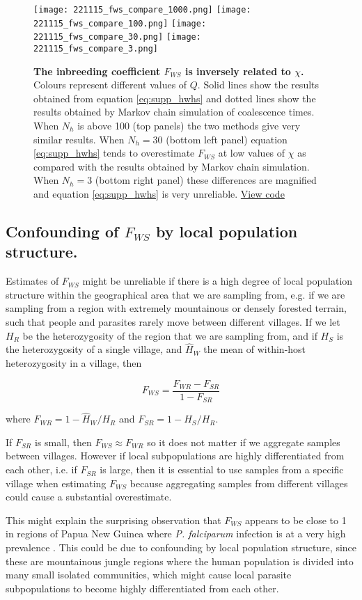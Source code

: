 \documentclass[_main.tex]{subfiles}
\begin{document}
\begin{figure}[h!]
\centering
\texttt{[image: 221115\_fws\_compare\_1000.png]}
\texttt{[image: 221115\_fws\_compare\_100.png]}
\texttt{[image: 221115\_fws\_compare\_30.png]}
\texttt{[image: 221115\_fws\_compare\_3.png]}
\caption{\textbf{The inbreeding coefficient $F_{WS}$ is inversely related to $\chi$.}  Colours represent different values of $Q$.  Solid lines show the results obtained from equation \ref{eq:supp_hwhs} and dotted lines show the results obtained by Markov chain simulation of coalescence times.  When $N_h$ is above 100 (top panels) the two methods give very similar results.  When $N_h = 30$ (bottom left panel) equation \ref{eq:supp_hwhs} tends to overestimate $F_{WS}$ at low values of $\chi$ as compared with the results obtained by Markov chain simulation.  When $N_h = 3$ (bottom right panel) these differences are magnified and equation \ref{eq:supp_hwhs} is very unreliable. 
\href{https://github.com/d-kwiat/gtg/blob/main/fws_compare_methods.ipynb}{View code}
}
\label{fig:supp_fws_compare_methods}
\end{figure}

\subsection{Confounding of \texorpdfstring{$F_{WS}$}{Fws} by local population structure.}
\label{supp_fws_pop_structure}  

Estimates of $F_{WS}$ might be unreliable if there is a high degree of local population structure within the geographical area that we are sampling from, e.g. if we are sampling from a region with extremely mountainous or densely forested terrain, such that people and parasites rarely move between different villages.  If we let $H_R$ be the heterozygosity of the region that we are sampling from, and if $H_S$ is the heterozygosity of a single village, and $\widehat{H}_W$ the mean of within-host heterozygosity in a village, then 

\begin{equation*}
F_{WS} = \frac{F_{WR} - F_{SR}}{1 - F_{SR}}
\end{equation*}

where $F_{WR} = 1 - \widehat{H}_W / H_R$ and $F_{SR} = 1 - H_S / H_R$.  

If $F_{SR}$ is small, then $F_{WS} \approx F_{WR}$ so it does not matter if we aggregate samples between villages.  However if local subpopulations are highly differentiated from each other, i.e. if $F_{SR}$ is large, then it is essential to use samples from a specific village when estimating $F_{WS}$ because aggregating samples from different villages could cause a substantial overestimate.

This might explain the surprising observation that $F_{WS}$ appears to be close to 1 in regions of Papua New Guinea where \textit{P. falciparum} infection is at a very high prevalence \cite{Manske2012,MalariaGEN2021}.  This could be due to confounding by local population structure, since these are mountainous jungle regions where the human population is divided into many small isolated communities, which might cause local parasite subpopulations to become highly differentiated from each other.
\end{document}
